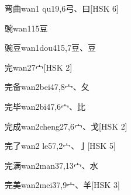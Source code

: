 \begin{EntryWithPhonetic}{弯曲}{wan1 qu1}{9,6}{⼸、⽈}[HSK 6]
\end{EntryWithPhonetic}

\begin{EntryWithPhonetic}{豌}{wan1}{15}{⾖}
\end{EntryWithPhonetic}

\begin{EntryWithPhonetic}{豌豆}{wan1dou4}{15,7}{⾖、⾖}
\end{EntryWithPhonetic}

\begin{EntryWithPhonetic}{完}{wan2}{7}{⼧}[HSK 2]
\end{EntryWithPhonetic}

\begin{EntryWithPhonetic}{完备}{wan2bei4}{7,8}{⼧、⼡}
\end{EntryWithPhonetic}

\begin{EntryWithPhonetic}{完毕}{wan2bi4}{7,6}{⼧、⽐}
\end{EntryWithPhonetic}

\begin{EntryWithPhonetic}{完成}{wan2cheng2}{7,6}{⼧、⼽}[HSK 2]
\end{EntryWithPhonetic}

\begin{EntryWithPhonetic}{完了}{wan2 le5}{7,2}{⼧、⼅}[HSK 5]
\end{EntryWithPhonetic}

\begin{EntryWithPhonetic}{完满}{wan2man3}{7,13}{⼧、⽔}
\end{EntryWithPhonetic}

\begin{EntryWithPhonetic}{完美}{wan2mei3}{7,9}{⼧、⽺}[HSK 3]
\end{EntryWithPhonetic}

